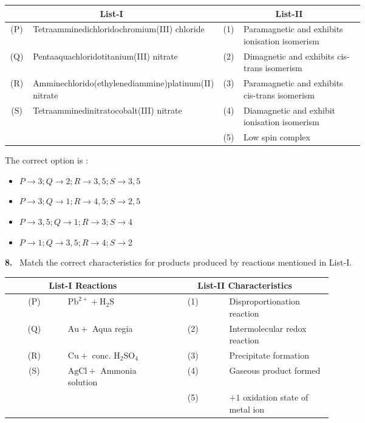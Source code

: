 \documentclass[10pt]{extarticle}
\newcommand{\qn}[1]{\par\smallskip\noindent\textbf{#1.}~}
\newenvironment{qoptions}{\begin{itemize}[leftmargin=1.8em,itemsep=1pt,topsep=2pt,label={}]}{\end{itemize}}
\newcommand{\opt}[2]{\item[(#1)] #2}
\begin{document}
\begin{multicols}{2}
{\footnotesize\setlength{\tabcolsep}{2pt}\begin{tabular}{|c|p{0.34\linewidth}|c|p{0.34\linewidth}|}
\hline
\multicolumn{2}{|c|}{\textbf{List-I}} & \multicolumn{2}{c|}{\textbf{List-II}}\\ \hline
(P) & Tetraammine\-dichlorido\-chromium(III) chloride & (1) & Para\-magnetic and exhibits ionisation iso\-merism\\ \hline
(Q) & Pentaaqua\-chlorido\-titanium(III) nitrate & (2) & Di\-magnetic and exhibits cis-trans isomerism\\ \hline
(R) & Ammine\-chlorido(ethylene\-diammine)\-platinum(II) nitrate & (3) & Para\-magnetic and exhibits cis-trans isomerism\\ \hline
(S) & Tetraammine\-dinitrato\-cobalt(III) nitrate & (4) & Dia\-magnetic and exhibit ionisation iso\-merism\\ \hline
 & & (5) & Low spin complex\\ \hline
\end{tabular}}\par
The correct option is :
\begin{qoptions}
\opt{A}{$P\to3;\allowbreak Q\to2;\allowbreak R\to3,5;\allowbreak S\to3,5$}
\opt{B}{$P\to3;\allowbreak Q\to1;\allowbreak R\to4,5;\allowbreak S\to2,5$}
\opt{C}{$P\to3,5;\allowbreak Q\to1;\allowbreak R\to3;\allowbreak S\to4$}
\opt{D}{$P\to1;\allowbreak Q\to3,5;\allowbreak R\to4;\allowbreak S\to2$}
\end{qoptions}
\qn{8} Match the correct characteristics for products produced by reactions mentioned in List-I.\par
{\small\setlength{\tabcolsep}{3pt}\begin{tabular}{|c|p{0.3\linewidth}|c|p{0.32\linewidth}|}
\hline
\multicolumn{2}{|c|}{\textbf{List-I} Reactions} & \multicolumn{2}{c|}{\textbf{List-II} Characteristics}\\ \hline
(P) & $\mathrm{Pb^{2+}+H_2S}$ & (1) & Disproportionation reaction\\ \hline
(Q) & $\mathrm{Au+}$ Aqua regia & (2) & Intermolecular redox reaction\\ \hline
(R) & $\mathrm{Cu+}$ conc. $\mathrm{H_2SO_4}$ & (3) & Precipitate formation\\ \hline
(S) & $\mathrm{AgCl+}$ Ammonia solution & (4) & Gaseous product formed\\ \hline
 & & (5) & $+1$ oxidation state of metal ion\\ \hline
\end{tabular}}\par

\end{multicols}
\end{document}
